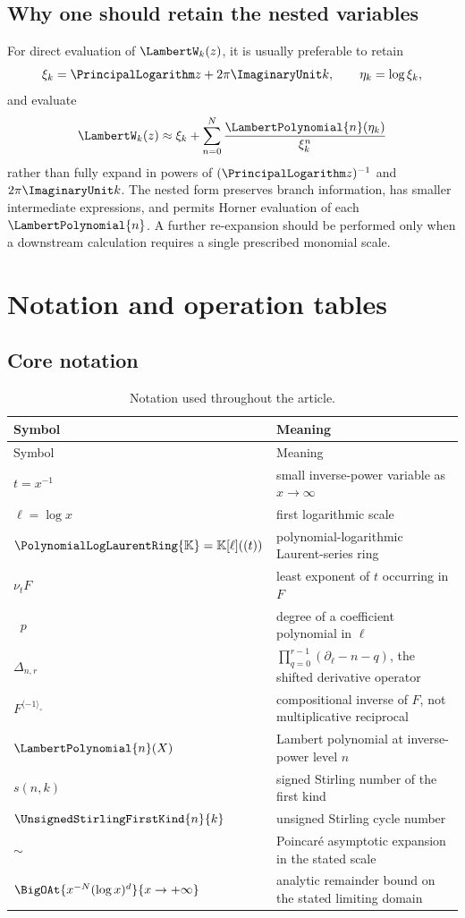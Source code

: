 \documentclass[11pt,oneside]{article}
\numberwithin{equation}{section}
\theoremstyle{definition}
\newcommand{\K}{\mathbb{K}}
\newcommand{\PL}{\PolynomialLogLaurentRing{\K}}
\newcommand{\ordx}{\nu_t}
\newcommand{\rev}{\langle-1\rangle_{\circ}}
\newcommand{\as}{\sim}
\DeclareMathOperator{\degell}{deg_{\ell}}
\begin{document}
\subsection{Why one should retain the nested variables}

For direct evaluation of \(\LambertW_k(z)\), it is usually preferable to retain
\[
  \xi_k=\PrincipalLogarithm z+2\pi \ImaginaryUnit k,
  \qquad \eta_k=\log\xi_k,
\]
and evaluate
\[
  \LambertW_k(z)\approx \xi_k+\sum_{n=0}^{N}\frac{\LambertPolynomial{n}(\eta_k)}{\xi_k^n}
\]
rather than fully expand in powers of \((\PrincipalLogarithm z)^{-1}\) and \(2\pi \ImaginaryUnit k\).
The nested form preserves branch information, has smaller intermediate
expressions, and permits Horner evaluation of each \(\LambertPolynomial{n}\).  A further
re-expansion should be performed only when a downstream calculation requires a
single prescribed monomial scale.

\section{Notation and operation tables}\label{app:tables}

\subsection{Core notation}

\begin{longtable}{@{}p{}p{}@{}}
\caption{Notation used throughout the article.}\label{tab:notation}\\
\toprule
Symbol & Meaning\\
\midrule
\endfirsthead
\toprule
Symbol & Meaning\\
\midrule
\endhead
\(t=x^{-1}\) & small inverse-power variable as \(x\to\infty\)\\
\(\ell=\log x\) & first logarithmic scale\\
\(\PL=\K[\ell]((t))\) & polynomial-logarithmic Laurent-series ring\\
\(\ordx F\) & least exponent of \(t\) occurring in \(F\)\\
\(\degell p\) & degree of a coefficient polynomial in \(\ell\)\\
\(\Delta_{n,r}\) & \(\prod_{q=0}^{r-1}(\partial_\ell-n-q)\), the shifted derivative operator\\
\(F^{\rev}\) & compositional inverse of \(F\), not multiplicative reciprocal\\
\(\LambertPolynomial{n}(X)\) & Lambert polynomial at inverse-power level \(n\)\\
\(s(n,k)\) & signed Stirling number of the first kind\\
\(\UnsignedStirlingFirstKind{n}{k}\) & unsigned Stirling cycle number\\
\(\as\) & Poincar\'e asymptotic expansion in the stated scale\\
\(\BigOAt{x^{-N}(\log x)^d}{x\to+\infty}\) & analytic remainder bound on the stated limiting domain\\
\bottomrule
\end{longtable}
\end{document}
